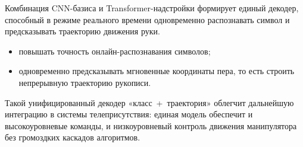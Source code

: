 \documentclass[12pt,a4paper]{article}
\begin{document}
Комбинация CNN-базиса и Transformer-надстройки формирует единый декодер, способный в режиме реального времени одновременно распознавать символ и предсказывать траекторию движения руки.


\begin{itemize}
  \item повышать точность онлайн-распознавания символов;
  \item одновременно предсказывать мгновенные координаты пера, то есть строить непрерывную траекторию рукописи.
\end{itemize}

Такой унифицированный декодер «класс~+~траектория» облегчит дальнейшую интеграцию в системы телеприсутствия: единая модель обеспечит и высокоуровневые команды, и низкоуровневый контроль движения манипулятора без громоздких каскадов алгоритмов.
\end{document}

